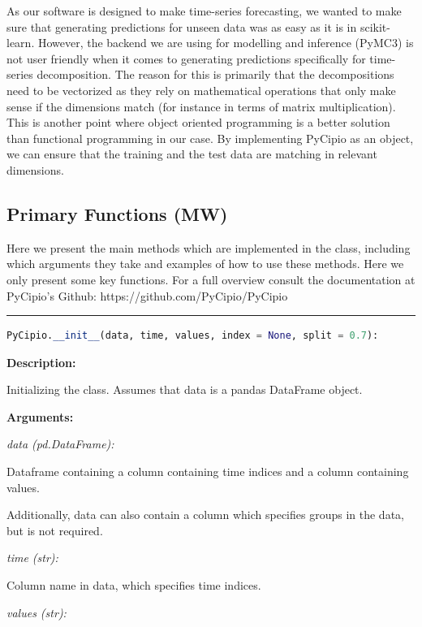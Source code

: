 \documentclass{article}
\begin{document}
\noindent As our software is designed to make time-series forecasting, we wanted to make sure that generating predictions for unseen data was as easy as it is in scikit-learn. However, the backend we are using for modelling and inference (PyMC3) is not user friendly when it comes to generating predictions specifically for time-series decomposition. The reason for this is primarily that the decompositions need to be vectorized as they rely on mathematical operations that only make sense if the dimensions match (for instance in terms of matrix multiplication). This is another point where object oriented programming is a better solution than functional programming in our case. By implementing PyCipio as an object, we can ensure that the training and the test data are matching in relevant dimensions. 

\subsection{Primary Functions (MW)}

\noindent Here we present the main methods which are implemented in the class, including which arguments they take and examples of how to use these methods. Here we only present some key functions. For a full overview consult the documentation at PyCipio’s Github: https://github.com/PyCipio/PyCipio

\hrule

\begin{lstlisting}[language=Python]
PyCipio.__init__(data, time, values, index = None, split = 0.7):
\end{lstlisting}

\indent \textbf{Description:} 

\indent \indent Initializing the class. Assumes that data is a pandas DataFrame object.

\indent \textbf{Arguments:}

\indent \indent \textit{data (pd.DataFrame):} 

\indent \indent \indent Dataframe containing a column containing time indices and a column containing values. 

\indent \indent \indent Additionally, data can also contain a column which specifies groups in the data, but is not required. 

\indent \indent \textit{time (str):} 

\indent \indent \indent Column name in data, which specifies time indices.

\indent \indent \textit{values (str):} 
\end{document}
